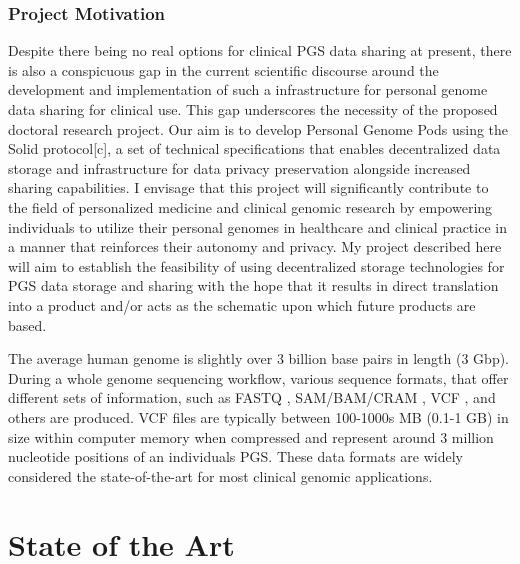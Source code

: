 \documentclass[runningheads]{llncs}
\begin{document}
\subsubsection{Project Motivation}
Despite there being no real options for clinical PGS data sharing at present, there is also a conspicuous gap in the current scientific discourse around the development and implementation of such a infrastructure for personal genome data sharing for clinical use. 
This gap underscores the necessity of the proposed doctoral research project.
Our aim is to develop Personal Genome Pods using the Solid protocol[c], a set of technical specifications that enables decentralized data storage and infrastructure for data privacy preservation alongside increased sharing capabilities.  
I envisage that this project will significantly contribute to the field of personalized medicine and clinical genomic research by empowering individuals to utilize their personal genomes in healthcare and clinical practice in a manner that reinforces their autonomy and privacy. 
My project described here will aim to establish the feasibility of using decentralized storage technologies for PGS data storage and sharing with the hope that it results in direct translation into a product and/or acts as the schematic upon which future products are based. 

The average human genome is slightly over 3 billion base pairs in length (3 Gbp). 
During a whole genome sequencing workflow, various sequence formats, that offer different sets of information, such as FASTQ \cite{cock_sanger_2010}, SAM/BAM/CRAM \cite{li_sequence_2009, bonfield_cram_2022}, VCF \cite{danecek_variant_2011}, and others are produced. 
VCF files are typically between 100-1000s MB (0.1-1 GB) in size within computer memory when compressed and represent around 3 million nucleotide positions of an individual\textquotesingle s PGS. 
These data formats are widely considered the state-of-the-art for most clinical genomic applications.


\section{State of the Art}

\end{document}
